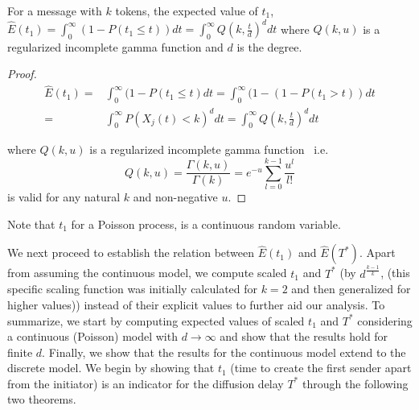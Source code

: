 \begin{theorem}
For a message with $k$ tokens, the expected value of $t_1$, 
$\hat E(t_{1})=\int_{0}^{\infty}(1-P(t_{1}\leq
t))dt = \int_{0}^{\infty}Q(k,\frac{t}
{d})^{d}dt$
where $Q(k,u)$ is a regularized incomplete gamma function and $d$ is the degree. 
\label{theorem-0}
\end{theorem}

\begin{proof}
 \begin{equation}
\begin{aligned} 
\hat E(t_{1})=&\int_{0}^{\infty}(1-P(t_{1}\leq
t)dt=\int_{0}^{\infty}(1-(1-P(t_{1}
>t))dt\\=&\int_{0}^{\infty}P(X_{j}(t)<k)^{d}dt=\int_{0}^{\infty}Q(k,\frac{t}
{d})^{d}dt\label{eqint} 
\end{aligned}
\end{equation}

where $Q(k,u)$ is a regularized incomplete gamma function~\cite{arfken1985incomplete} i.e. 
\begin{equation}
Q(k,u)=\frac{\Gamma(k,u)}{\Gamma(k)}=e^{-u}\sum_{l=0}^{k-1}\frac{u^{l}}{l!}
\end{equation}
is valid for any natural $k$ and non-negative $u$.

\end{proof}

Note that $t_{1}$ for a Poisson process, is a continuous random variable. 

 We next proceed to establish the relation between $\hat E(t_1)$ and $\hat E(T^{*})$. Apart from assuming the continuous model, 
we compute scaled $t_1$ and $T^{*}$ (by $d^{\frac{k-1}{k}}$, 
(this specific scaling function was initially calculated for $k=2$ and then generalized for higher values)) instead of their explicit values to further aid our analysis. 
To summarize, we start by computing  
expected values of scaled $t_1$ and $T^{*}$ considering a continuous (Poisson) model with $d\rightarrow \infty$ and show that the results hold for finite $d$. Finally, we show that the results for the continuous model extend to the discrete model.
We begin by showing that $t_1$ (time to create the first sender apart from the initiator) is an indicator for the diffusion delay $T^*$ through the following two theorems. 


